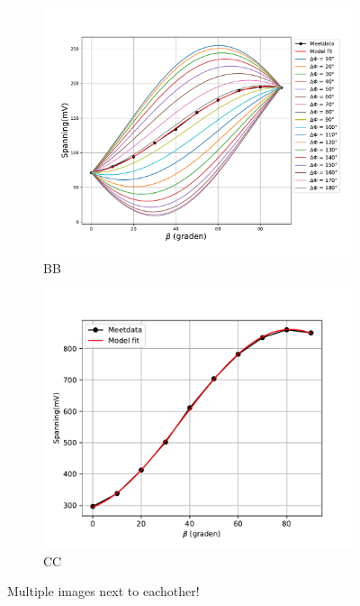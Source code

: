 \documentclass{article}
\begin{document}
\begin{figure}[htbp]
    \centering
    \begin{subfigure}[b]{0.45\textwidth}
        \includegraphics[width=\textwidth]{AA}
        \caption{BB}
        \label{fig:dphiExample}
    \end{subfigure}\qquad
    \begin{subfigure}[b]{0.45\textwidth}
        \includegraphics[width=\textwidth]{CC}
        \caption{CC}
        \label{fig:fitExample}
    \end{subfigure}
    \caption{Multiple images next to eachother!}
\end{figure}
\end{document}
